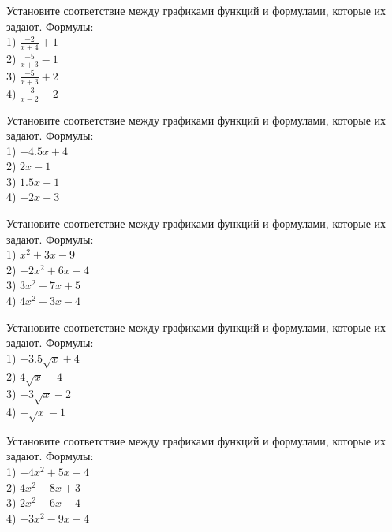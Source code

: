 \documentclass[4apaper]{article}
\begin{document}
\begin{taskBN}{11}
Установите соответствие между графиками функций и формулами, которые их задают. Формулы: \\1) $\frac{-2}{x+4}+1$\\2) $\frac{-5}{x+3}-1$\\3) $\frac{-5}{x+3}+2$\\4) $\frac{-3}{x-2}-2$
\end{taskBN}

\begin{taskBN}{12}
Установите соответствие между графиками функций и формулами, которые их задают. Формулы: \\1) $-4.5x+4$\\2) $2x-1$\\3) $1.5x+1$\\4) $-2x-3$
\end{taskBN}

\begin{taskBN}{13}
Установите соответствие между графиками функций и формулами, которые их задают. Формулы: \\1) $x^2+3x-9$\\2) $-2x^2+6x+4$\\3) $3x^2+7x+5$\\4) $4x^2+3x-4$
\end{taskBN}

\begin{taskBN}{14}
Установите соответствие между графиками функций и формулами, которые их задают. Формулы: \\1) $-3.5\sqrt{x}+4$\\2) $4\sqrt{x}-4$\\3) $-3\sqrt{x}-2$\\4) $-\sqrt{x}-1$
\end{taskBN}

\begin{taskBN}{15}
Установите соответствие между графиками функций и формулами, которые их задают. Формулы: \\1) $-4x^2+5x+4$\\2) $4x^2-8x+3$\\3) $2x^2+6x-4$\\4) $-3x^2-9x-4$
\end{taskBN}
\end{document}
